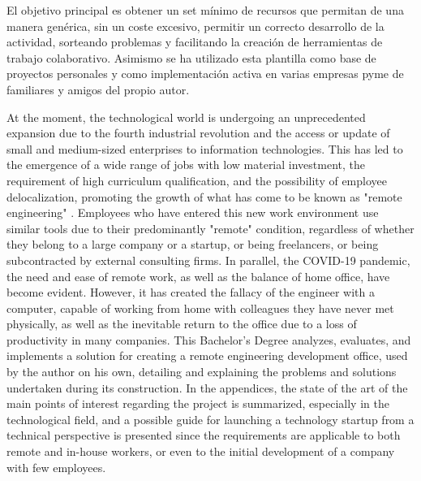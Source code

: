 \documentclass[spanish,final]{setup/eetac_tfc_pfc}
\begin{document}
\begin{resum}{10cm}
\newline
 El objetivo principal es obtener un set mínimo de recursos que permitan de una manera genérica, sin un coste excesivo, permitir un correcto desarrollo de la actividad, sorteando problemas y facilitando la creación de herramientas de trabajo colaborativo.\newline
\newline
Asimismo se ha utilizado esta plantilla como base de proyectos personales y como implementación activa en varias empresas pyme de familiares y amigos del propio autor.

\end{resum}

\begin{overview}{10cm}
At the moment, the technological world is undergoing an unprecedented expansion due to the fourth industrial revolution\cite{c_revolucion_4_0} and the access or update of small and medium-sized enterprises to information technologies\cite{c_pyme_digital}. This has led to the emergence of a wide range of jobs with low material investment, the requirement of high curriculum qualification, and the possibility of employee delocalization, promoting the growth of what has come to be known as "remote engineering"\cite{c_remote_work_stat_uk} \cite{c_remote_work_stat_talent}. Employees who have entered this new work environment use similar tools due to their predominantly "remote" condition, regardless of whether they belong to a large company or a startup, or being freelancers, or being subcontracted by external consulting firms.\newline
\newline
In parallel, the COVID-19 pandemic\cite{c_covid_remote}, the need and ease of remote work, as well as the balance of home office, have become evident. However, it has created the fallacy of the engineer with a computer, capable of working from home with colleagues they have never met physically, as well as the inevitable return to the office due to a loss of productivity in many companies\cite{c_back_office}.\newline
\newline
This Bachelor's Degree analyzes, evaluates, and implements a solution for creating a remote engineering development office, used by the author on his own, detailing and explaining the problems and solutions undertaken during its construction.\newline
\newline
In the appendices, the state of the art of the main points of interest regarding the project is summarized, especially in the technological field, and a possible guide for launching a technology startup from a technical perspective is presented since the requirements are applicable to both remote and in-house workers, or even to the initial development of a company with few employees.\newline

\end{overview}
\end{document}

